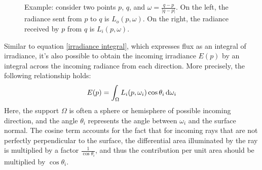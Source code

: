 \begin{figure}[H]
\begin{tikzpicture}[x=0.75pt,y=0.75pt,yscale=-1,xscale=1]
\end{tikzpicture}

\caption{Example: consider two points $p$, $q$, and $\omega=\frac{q-p}{|q-p|}$. On the left, the radiance sent from $p$ to $q$ is $L_o(p,\omega)$. On the right, the radiance received by $p$ from $q$ is $L_i(p,\omega)$.}
\end{figure}
Similar to equation \ref{irradiance integral}, which expresses flux as an integral of irradiance, it's also possible to obtain the incoming irradiance $E(p)$ by an integral across the incoming radiance from each direction. More precisely, the following relationship holds:
\begin{align}
    E(p) = \int_\Omega L_i(p,\omega_i)\cos\theta_i\d\omega_i
    \label{radiance integral}
\end{align}
Here, the support $\Omega$ is often a sphere or hemisphere of possible incoming direction, and the angle $\theta_i$ represents the angle between $\omega_i$ and the surface normal. The cosine term accounts for the fact that for incoming rays that are not perfectly perpendicular to the surface, the differential area illuminated by the ray is multiplied by a factor $\frac{1}{\cos\theta_i}$, and thus the contribution per unit area should be multiplied by $\cos\theta_i$. 
